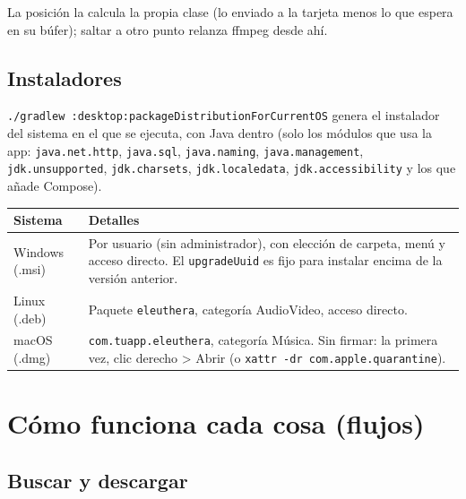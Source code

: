 \documentclass[11pt,a4paper,oneside]{report}
\newcommand{\cod}[1]{\texttt{\small #1}}
\newenvironment{dosCol}[2]{%
  \small
  \begin{longtable}{>{\raggedright\arraybackslash}p{5.3cm} >{\raggedright\arraybackslash}p{10.6cm}}
  \toprule
  \textbf{#1} & \textbf{#2} \\ \midrule \endhead
  \bottomrule \endfoot
}{\end{longtable}}
\begin{document}
La posición la calcula la propia clase (lo enviado a la tarjeta menos lo que espera en su
búfer); saltar a otro punto relanza ffmpeg desde ahí.

\section{Instaladores}

\cod{./gradlew :desktop:packageDistributionForCurrentOS} genera el instalador del sistema en el
que se ejecuta, con Java dentro (solo los módulos que usa la app: \cod{java.net.http},
\cod{java.sql}, \cod{java.naming}, \cod{java.management}, \cod{jdk.unsupported},
\cod{jdk.charsets}, \cod{jdk.localedata}, \cod{jdk.accessibility} y los que añade Compose).

\begin{dosCol}{Sistema}{Detalles}
  Windows (.msi) & Por usuario (sin administrador), con elección de carpeta, menú y acceso
    directo. El \cod{upgradeUuid} es fijo para instalar encima de la versión anterior. \\
  Linux (.deb) & Paquete \cod{eleuthera}, categoría AudioVideo, acceso directo. \\
  macOS (.dmg) & \cod{com.tuapp.eleuthera}, categoría Música. Sin firmar: la primera vez,
    clic derecho > Abrir (o \cod{xattr -dr com.apple.quarantine}). \\
\end{dosCol}

\chapter{Cómo funciona cada cosa (flujos)}

\section{Buscar y descargar}
\end{document}

